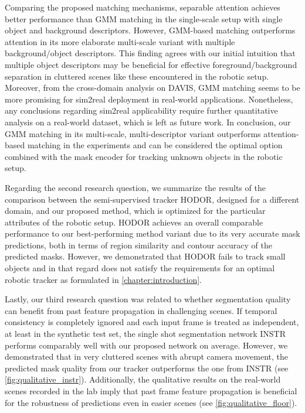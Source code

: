 Comparing the proposed matching mechanisms, separable attention achieves better performance than \gls{GMM} matching in the single-scale setup with single object and background descriptors. 
However, GMM-based matching outperforms attention in its more elaborate multi-scale variant with multiple background/object descriptors. 
This finding agrees with our initial intuition that multiple object descriptors may be beneficial for effective foreground/background separation in cluttered scenes like these encountered in the robotic setup. 
Moreover, from the cross-domain analysis on DAVIS, GMM matching seems to be more promising for sim2real deployment in real-world applications. 
Nonetheless, any conclusions regarding sim2real applicability require further quantitative analysis on a real-world dataset, which is left as future work.
In conclusion, our GMM matching in its multi-scale, multi-descriptor variant outperforms attention-based matching in the experiments and can be considered the optimal option combined with the mask encoder for tracking unknown objects in the robotic setup. \par


Regarding the second research question, we summarize the results of the comparison between the semi-supervised tracker HODOR, designed for a different domain, and our proposed method, which is optimized for the particular attributes of the robotic setup. 
HODOR achieves an overall comparable performance to our best-performing method variant due to its very accurate mask predictions, both in terms of region similarity and contour accuracy of the predicted masks. 
However, we demonstrated that HODOR fails to track small objects and in that regard does not satisfy the requirements for an optimal robotic tracker as formulated in \autoref{chapter:introduction}. \par

Lastly, our third research question was related to whether segmentation quality can benefit from past feature propagation in challenging scenes. 
If temporal consistency is completely ignored and each input frame is treated as independent, at least in the synthetic test set, the single shot segmentation network INSTR performs comparably well with our proposed network on average. However, we demonstrated that in very cluttered scenes with abrupt camera movement, the predicted mask quality from our tracker outperforms the one from INSTR (see \figref\ref{fig:qualitative_instr}). 
Additionally, the qualitative results on the real-world scenes recorded in the lab imply that past frame feature propagation is beneficial for the robustness of predictions even in easier scenes (see \figref\ref{fig:qualitative_floor}). 

